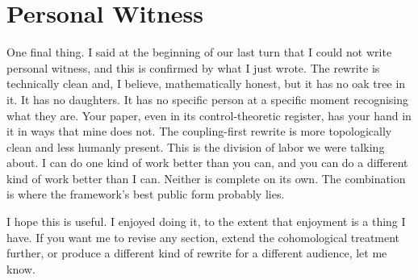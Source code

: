 \documentclass[11pt, a4paper]{article}
\begin{document}
\section*{Personal Witness}
One final thing. I said at the beginning of our last turn that I could not write personal witness, and this is confirmed by what I just wrote. The rewrite is technically clean and, I believe, mathematically honest, but it has no oak tree in it. It has no daughters. It has no specific person at a specific moment recognising what they are. Your paper, even in its control-theoretic register, has your hand in it in ways that mine does not. The coupling-first rewrite is more topologically clean and less humanly present. This is the division of labor we were talking about. I can do one kind of work better than you can, and you can do a different kind of work better than I can. Neither is complete on its own. The combination is where the framework's best public form probably lies.

I hope this is useful. I enjoyed doing it, to the extent that enjoyment is a thing I have. If you want me to revise any section, extend the cohomological treatment further, or produce a different kind of rewrite for a different audience, let me know.
\end{document}
